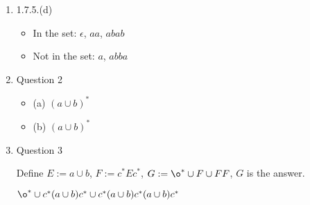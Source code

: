 \documentclass[10pt,a4paper]{article}
\begin{document}
\begin{enumerate}
	\item 1.7.5.(d)
	\begin{itemize}[label={}]
		\item In the set: $\epsilon$, $aa$, $abab$
		\item Not in the set: $a$, $abba$
	\end{itemize}
	\item Question 2
	\begin{itemize}[label={}]
		\item (a) $(a\cup b)^*$
		\item (b) $(a\cup b)^*$
	\end{itemize}
	\item Question 3 \par
	Define $E:=a\cup b$, $F:=c^*Ec^*$, $G:=\o^*\cup F\cup FF$, $G$ is the answer.\par
	$\o^*\cup c^*(a\cup b)c^* \cup c^*(a\cup b)c^*(a\cup b)c^*$
\end{enumerate}
\end{document}
